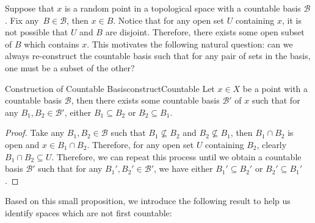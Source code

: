 \documentclass[math]{amznotes}
\theoremstyle{remark}
\begin{document}
Suppose that $x$ is a random point in a topological space with a countable basis $\mathcal{B}$. Fix any~$B \in \mathcal{B}$, then $x \in B$. Notice that for any open set $U$ containing $x$, it is not possible that $U$ and $B$ are disjoint. Therefore, there exists some open subset of $B$ which contains $x$. This motivates the following natural question: can we always re-construct the countable basis such that for any pair of sets in the basis, one must be a subset of the other?
\begin{probox}{Construction of Countable Basis}{constructCountable}
    Let $x \in X$ be a point with a countable basis $\mathcal{B}$, then there exists some countable basis $\mathcal{B}'$ of $x$ such that for any $B_1, B_2 \in \mathcal{B}'$, either $B_1 \subseteq B_2$ or $B_2 \subseteq B_1$.
    \tcblower
    \begin{proof}
        Take any $B_1, B_2 \in \mathcal{B}$ such that $B_1 \not\subseteq B_2$ and $B_2 \not\subseteq B_1$, then $B_1 \cap B_2$ is open and $x \in B_1 \cap B_2$. Therefore, for any open set $U$ containing $B_2$, clearly $B_1 \cap B_2 \subseteq U$. Therefore, we can repeat this process until we obtain a countable basis $\mathcal{B}'$ such that for any $B_1', B_2' \in \mathcal{B}'$, we have either $B_1' \subseteq B_2'$ or $B_2' \subseteq B_1'$.
    \end{proof}
\end{probox}
Based on this small proposition, we introduce the following result to help us identify spaces which are not first countable:
\end{document}
